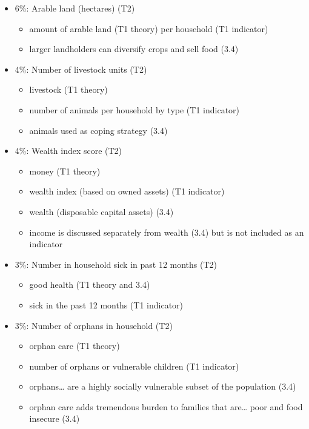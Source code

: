 \documentclass[
]{article}
\providecommand{\tightlist}{%
  \setlength{\itemsep}{0pt}\setlength{\parskip}{0pt}}
\begin{document}
\begin{itemize}
\tightlist
\item
  6\%: Arable land (hectares) (T2)

  \begin{itemize}
  \tightlist
  \item
    amount of arable land (T1 theory) per household (T1 indicator)
  \item
    larger landholders can diversify crops and sell food (3.4)
  \end{itemize}
\item
  4\%: Number of livestock units (T2)

  \begin{itemize}
  \tightlist
  \item
    livestock (T1 theory)
  \item
    number of animals per household by type (T1 indicator)
  \item
    animals used as coping strategy (3.4)
  \end{itemize}
\item
  4\%: Wealth index score (T2)

  \begin{itemize}
  \tightlist
  \item
    money (T1 theory)
  \item
    wealth index (based on owned assets) (T1 indicator)
  \item
    wealth (disposable capital assets) (3.4)
  \item
    income is discussed separately from wealth (3.4) but is not included
    as an indicator
  \end{itemize}
\item
  3\%: Number in household sick in past 12 months (T2)

  \begin{itemize}
  \tightlist
  \item
    good health (T1 theory and 3.4)
  \item
    sick in the past 12 months (T1 indicator)
  \end{itemize}
\item
  3\%: Number of orphans in household (T2)

  \begin{itemize}
  \tightlist
  \item
    orphan care (T1 theory)
  \item
    number of orphans or vulnerable children (T1 indicator)
  \item
    orphans\ldots{} are a highly socially vulnerable subset of the
    population (3.4)
  \item
    orphan care adds tremendous burden to families that are\ldots{} poor
    and food insecure (3.4)
  \end{itemize}
\end{itemize}
\end{document}
